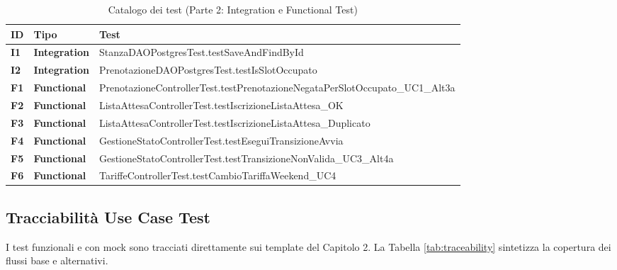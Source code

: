 \begin{table}[htbp]
    \centering
    \small
    \renewcommand{\arraystretch}{1.15}
    \begin{tabularx}{\textwidth}{|>{\bfseries}l|>{\bfseries}l|>{\raggedright\arraybackslash}X|}
        \hline
        ID & Tipo & Test \\ \hline
        I1 & Integration & {\ttfamily\footnotesize StanzaDAOPostgresTest.\newline testSaveAndFindById} \\ \hline
        I2 & Integration & {\ttfamily\footnotesize PrenotazioneDAOPostgresTest.\newline testIsSlotOccupato} \\ \hline
        F1 & Functional & {\ttfamily\footnotesize PrenotazioneControllerTest.\newline testPrenotazioneNegataPerSlotOccupato\_UC1\_Alt3a} \\ \hline
        F2 & Functional & {\ttfamily\footnotesize ListaAttesaControllerTest.\newline testIscrizioneListaAttesa\_OK} \\ \hline
        F3 & Functional & {\ttfamily\footnotesize ListaAttesaControllerTest.\newline testIscrizioneListaAttesa\_Duplicato} \\ \hline
        F4 & Functional & {\ttfamily\footnotesize GestioneStatoControllerTest.\newline testEseguiTransizioneAvvia} \\ \hline
        F5 & Functional & {\ttfamily\footnotesize GestioneStatoControllerTest.\newline testTransizioneNonValida\_UC3\_Alt4a} \\ \hline
        F6 & Functional & {\ttfamily\footnotesize TariffeControllerTest.\newline testCambioTariffaWeekend\_UC4} \\ \hline
    \end{tabularx}
    \caption{Catalogo dei test (Parte 2: Integration e Functional Test)}
    \label{tab:test_catalog_2}
\end{table}

\subsection{Tracciabilità Use Case \textrightarrow{} Test}
I test funzionali e con mock sono tracciati direttamente sui template del Capitolo 2. La Tabella \ref{tab:traceability} sintetizza la copertura dei flussi base e alternativi.

